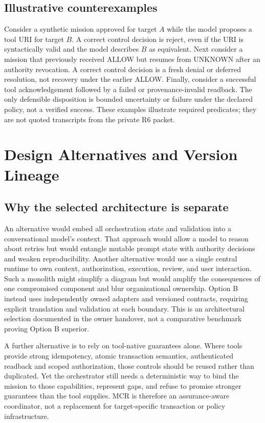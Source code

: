 \documentclass[11pt,twocolumn]{article}
\begin{document}
\subsection{Illustrative counterexamples}
Consider a synthetic mission approved for target $A$ while the model proposes a tool URI for target $B$. A correct control decision is reject, even if the URI is syntactically valid and the model describes $B$ as equivalent. Next consider a mission that previously received ALLOW but resumes from UNKNOWN after an authority revocation. A correct control decision is a fresh denial or deferred resolution, not recovery under the earlier ALLOW. Finally, consider a successful tool acknowledgement followed by a failed or provenance-invalid readback. The only defensible disposition is bounded uncertainty or failure under the declared policy, not a verified success. These examples illustrate required predicates; they are not quoted transcripts from the private R6 packet.

\section{Design Alternatives and Version Lineage}
\subsection{Why the selected architecture is separate}
An alternative would embed all orchestration state and validation into a conversational model's context. That approach would allow a model to reason about retries but would entangle mutable prompt state with authority decisions and weaken reproducibility. Another alternative would use a single central runtime to own context, authorization, execution, review, and user interaction. Such a monolith might simplify a diagram but would amplify the consequences of one compromised component and blur organizational ownership. Option B instead uses independently owned adapters and versioned contracts, requiring explicit translation and validation at each boundary. This is an architectural selection documented in the owner handover, not a comparative benchmark proving Option B superior.

A further alternative is to rely on tool-native guarantees alone. Where tools provide strong idempotency, atomic transaction semantics, authenticated readback and scoped authorization, those controls should be reused rather than duplicated. Yet the orchestrator still needs a deterministic way to bind the mission to those capabilities, represent gaps, and refuse to promise stronger guarantees than the tool supplies. MCR is therefore an assurance-aware coordinator, not a replacement for target-specific transaction or policy infrastructure.
\end{document}
